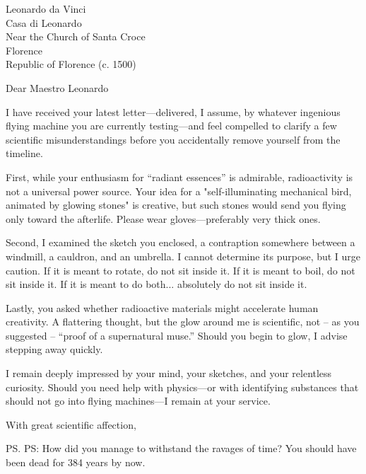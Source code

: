 \documentclass[
  paper=a4,
  parskip=half,
  firstfoot=false,
  enlargefirstpage=true,
]{scrlttr2}
\begin{document}
\begin{letter}{%
  Leonardo da Vinci\\
  Casa di Leonardo\\
  Near the Church of Santa Croce\\
  Florence\\
  Republic of Florence (c. 1500)
}

\opening{Dear Maestro Leonardo}

I have received your latest letter---delivered, I assume, by whatever ingenious flying
machine you are currently testing---and feel compelled to clarify a few scientific
misunderstandings before you accidentally remove yourself from the timeline.

First, while your enthusiasm for \enquote{radiant essences} is admirable, radioactivity is
not a universal power source. Your idea for a "self-illuminating mechanical bird,
animated by glowing stones" is creative, but such stones would send you flying only
toward the afterlife. Please wear gloves---preferably very thick ones.

Second, I examined the sketch you enclosed, a contraption somewhere between a windmill,
a cauldron, and an umbrella. I cannot determine its purpose, but I urge caution. If it
is meant to rotate, do not sit inside it. If it is meant to boil, do not sit inside it.
If it is meant to do both... absolutely do not sit inside it.

Lastly, you asked whether radioactive materials might accelerate human creativity.
A flattering thought, but the glow around me is scientific, not -- as you
suggested -- \enquote{proof of a supernatural muse.} Should you begin to glow,
I advise stepping away quickly.

I remain deeply impressed by your mind, your sketches, and your relentless curiosity.
Should you need help with physics---or with identifying substances that should not go
into flying machines---I remain at your service.

\closing{With great scientific affection,}
\ps{PS: How did you manage to withstand the ravages of time?
You should have been dead for 384 years by now.}

\end{letter}
\thispagestyle{empty}
\pagestyle{empty}
\end{document}

